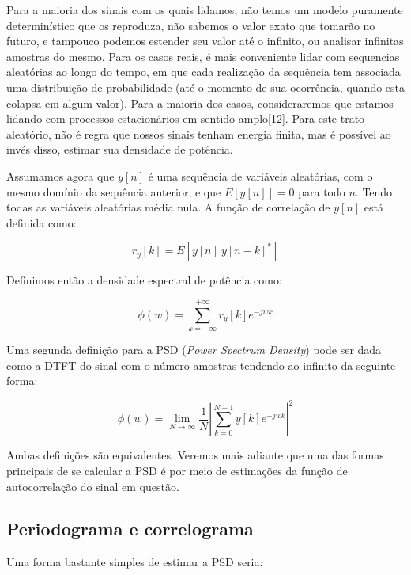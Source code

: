 \documentclass[a4paper, 12pt]{book}
\begin{document}
Para a maioria dos sinais com os quais lidamos, não temos um modelo puramente determinístico que os reproduza, não sabemos o valor exato que tomarão no futuro, e tampouco podemos estender seu valor até o infinito, ou analisar infinitas amostras do mesmo. Para os casos reais, é mais conveniente lidar com sequencias aleatórias ao longo do tempo, em que cada realização da sequência tem associada uma distribuição de probabilidade (até o momento de sua ocorrência, quando esta colapsa em algum valor). Para a maioria dos casos, consideraremos que estamos lidando com processos estacionários em sentido amplo[12]. Para este trato aleatório, não é regra que nossos sinais tenham energia finita, mas é possível ao invés disso, estimar sua densidade de potência.

\indent Assumamos agora que $y[n]$ é uma sequência de variáveis aleatórias, com o mesmo domínio da sequência anterior, e que $E[y[n]]=0$ para todo $n$. Tendo todas as variáveis aleatórias média nula. A função de correlação de $y[n]$ está definida como:

\begin{equation}
 r_y[k]=E[ y[n] \: y[n-k]^*]
\end{equation}
  
\indent Definimos então a densidade espectral de potência como:

\begin{equation}
\phi (w)=\sum_{k=-\infty}^{+\infty}r_y[k]e^{-jwk}
\end{equation}

\indent Uma segunda definição para a PSD (\textit{Power Spectrum Density}) pode ser dada como a DTFT do sinal com o número amostras tendendo ao infinito da seguinte forma:

\begin{equation}
\phi(w)=\lim_{N\rightarrow \infty}\frac{1}{N}\left|\sum_{k=0}^{N-1}y[k]e^{-jwk}  \right|^2
\end{equation}

\indent Ambas definições são equivalentes. Veremos mais adiante que uma das formas principais de se calcular a PSD é por meio de estimações da função de autocorrelação do sinal em questão.


\subsection{Periodograma e correlograma}

Uma forma bastante simples de estimar a PSD seria:
\end{document}
